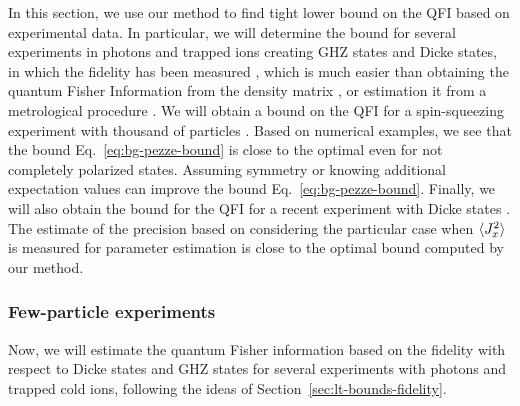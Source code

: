 In this section, we use our method to find tight lower bound on the QFI based on experimental data.
In particular, we will determine the bound for several experiments in photons and trapped ions creating GHZ states and Dicke states, in which the fidelity has been measured \cite{Krischek2011, Zhao2003, Gao2010, Leibfrid2004, Sackett2000, Monz2011, Kiesel2007, Wieczorek2009, Prevedel2009, Chiuri2012}, which is much easier than obtaining the quantum Fisher Information from the density matrix \cite{Hyllus2012}, or estimation it from a metrological procedure \cite{Luecke2011}.
We will obtain a bound on the QFI for a spin-squeezing experiment with thousand of particles \cite{Gross2010}.
Based on numerical examples, we see that the bound Eq.~\eqref{eq:bg-pezze-bound} is close to the optimal even for not completely polarized states.
Assuming symmetry or knowing additional expectation values can improve the bound Eq.~\eqref{eq:bg-pezze-bound}.
Finally, we will also obtain the bound for the QFI for a recent experiment with Dicke states \cite{Luecke2014}.
The estimate of the precision based on considering the particular case when $\langle{J_x^2}\rangle$ is measured for parameter estimation \cite{Apellaniz2015} is close to the optimal bound computed by our method.

\subsubsection{Few-particle experiments}

Now, we will estimate the quantum Fisher information based on the fidelity with respect to Dicke states and GHZ states for several experiments with photons and trapped cold ions, following the ideas of Section~\ref{sec:lt-bounds-fidelity}.

